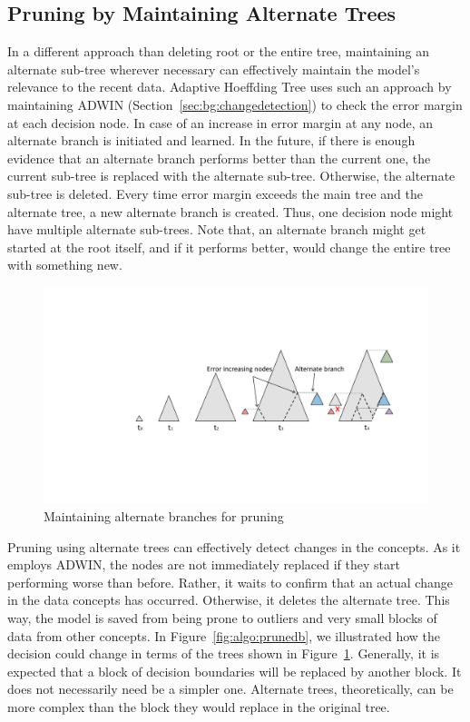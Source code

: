 \subsection{Pruning by Maintaining Alternate Trees}
In a different approach than deleting root or the entire tree, maintaining an alternate sub-tree wherever necessary can effectively maintain the model's relevance to the recent data. Adaptive Hoeffding Tree uses such an approach by maintaining ADWIN (Section~\ref{sec:bg:changedetection}) to check the error margin at each decision node. In case of an increase in error margin at any node, an alternate branch is initiated and learned. In the future, if there is enough evidence that an alternate branch performs better than the current one, the current sub-tree is replaced with the alternate sub-tree. Otherwise, the alternate sub-tree is deleted. Every time error margin exceeds the main tree and the alternate tree, a new alternate branch is created. Thus, one decision node might have multiple alternate sub-trees. Note that, an alternate branch might get started at the root itself, and if it performs better, would change the entire tree with something new.

\begin{figure}[htbp]
    \begin{center}
        \includegraphics[width=14.0cm]{figs/prune.pdf}
        \caption{Maintaining alternate branches for pruning}
        \label{fig:algo:prune}
    \end{center}
\end{figure}

Pruning using alternate trees can effectively detect changes in the concepts. As it employs ADWIN, the nodes are not immediately replaced if they start performing worse than before. Rather, it waits to confirm that an actual change in the data concepts has occurred. Otherwise, it deletes the alternate tree. This way, the model is saved from being prone to outliers and very small blocks of data from other concepts. In Figure~\ref{fig:algo:prunedb}, we illustrated how the decision could change in terms of the trees shown in Figure~\ref{fig:algo:prune}. Generally, it is expected that a block of decision boundaries will be replaced by another block. It does not necessarily need be a simpler one. Alternate trees, theoretically, can be more complex than the block they would replace in the original tree.

